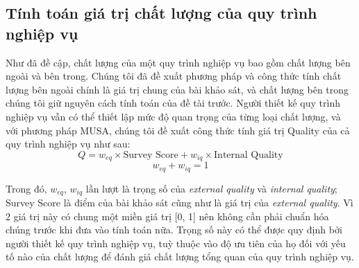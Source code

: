 \subsection{Tính toán giá trị chất lượng của quy trình nghiệp vụ}
Như đã đề cập, chất lượng của một quy trình nghiệp vụ bao gồm chất lượng bên ngoài và bên trong. Chúng tôi đã đề xuất phương pháp và công thức tính chất lượng bên ngoài chính là giá trị chung của bài khảo sát, và chất lượng bên trong chúng tôi giữ nguyên cách tính toán của đề tài trước.
Người thiết kế quy trình nghiệp vụ vẫn có thể thiết lập mức độ quan trọng của từng loại chất lượng, và với phương pháp MUSA, chúng tôi đề xuất công thức tính giá trị Quality của cả quy trình nghiệp vụ như sau:
\[ Q =  w_{eq} \times \text{Survey Score} + w_{iq} \times \text{Internal Quality}\]
\[w_{eq} + w_{iq} = 1\]
\par
Trong đó, $w_{eq}$, $w_{iq}$ lần lượt là trọng số của \emph{external quality} và \emph{internal quality}; Survey Score là điểm của bài khảo sát cũng như là giá trị của \emph{external quality}. Vì 2 giá trị này có chung một miền giá trị [0, 1] nên không cần phải chuẩn hóa chúng trước khi đưa vào tính toán nữa. Trọng số này có thể được quy định bởi người thiết kế quy trình nghiệp vụ, tuỳ thuộc vào độ ưu tiên của họ đối với yếu tố nào của chất lượng để đánh giá chất lượng tổng quan của quy trình nghiệp vụ.
